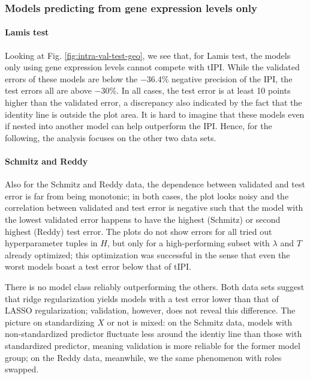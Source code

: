 \subsubsection{Models predicting from gene expression levels only}



\paragraph{Lamis test}
Looking at Fig. \ref{fig:intra-val-test-geo}, we see that, for Lamis test, the models only using 
gene expression levels cannot compete with $\text{tIPI}$. While the validated errors of these models are 
below the \num{-36.4}\% negative precision of the IPI, the test errors all are above \num{-30}\%. 
In all cases, the test error is at least 10 points higher than the validated error, a discrepancy 
also indicated by the fact that the identity line is outside the plot area. It is hard to imagine that 
these models even if nested into another model can help outperform the IPI. Hence, for the 
following, the analysis focuses on the other two data sets.

\paragraph{Schmitz and Reddy}
Also for the Schmitz and Reddy data, the dependence between validated and test error is far from 
being monotonic; in both cases, the plot looks noisy and the correlation between validated and test 
error is negative such that the model with the lowest validated error happens to have the highest 
(Schmitz) or second highest (Reddy) test error. The plots do not show errors for all tried out 
hyperparameter tuples in $H$, but only for a high-performing subset with $\lambda$ and $T$ already 
optimized; this optimization was successful in the sense that even the worst models boast a test 
error below that of $\text{tIPI}$.

There is no model class reliably outperforming the others. Both data sets suggest that ridge 
regularization yields models with a test error lower than that of LASSO regularization; validation, 
however, does not reveal this difference. The picture on standardizing $X$ or not is mixed: on the 
Schmitz data, models with non-standardized predictor fluctuate less around the identiy line than 
those with standardized predictor, meaning validation is more reliable for the former model group;
on the Reddy data, meanwhile, we the same phenomenon with roles swapped.

